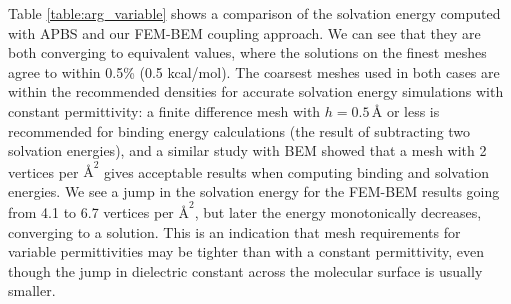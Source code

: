 Table \ref{table:arg_variable} shows a comparison of the solvation energy computed with APBS and our FEM-BEM coupling approach. We can see that they are both converging to equivalent values, where the solutions on the finest meshes agree to within 0.5\% (0.5 kcal/mol). The coarsest meshes used in both cases are within the recommended densities for accurate solvation energy simulations with constant permittivity: a finite difference mesh with $h=0.5\,\text{\AA}$ or less is recommended for binding energy calculations\cite{sorensen2015comprehensive} (the result of subtracting two solvation energies), and a similar study with BEM\cite{CooperBardhanBarba2014} showed that a mesh with 2 vertices per $\text{\AA}^2$ gives acceptable results when computing binding and solvation energies. We see a jump in the solvation energy for the FEM-BEM results going from 4.1 to 6.7 vertices per $\text{\AA}^2$, but later the energy monotonically decreases, converging to a solution. This is an indication that mesh requirements for variable permittivities may be tighter than with a constant permittivity, even though the jump in dielectric constant across the molecular surface is usually smaller. 

